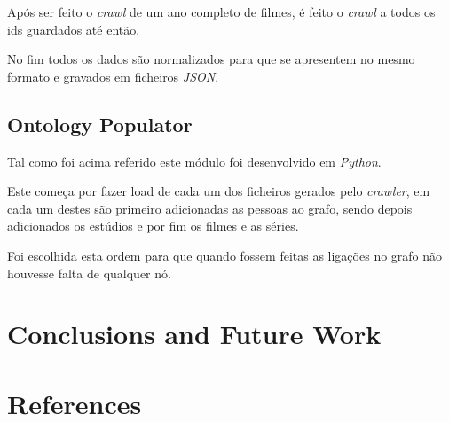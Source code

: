 \documentclass[a4paper]{article}
\begin{document}
Após ser feito o \textit{crawl} de um ano completo de filmes, é feito o \textit{crawl} a todos os ids guardados até então.

No fim todos os dados são normalizados para que se apresentem no mesmo formato e gravados em ficheiros \textit{JSON}.

\subsection{Ontology Populator}
\indent \indent Tal como foi acima referido este módulo foi desenvolvido em \textit{Python}. 

Este começa por fazer load de cada um dos ficheiros gerados pelo \textit{crawler}, em cada um destes são primeiro adicionadas as pessoas ao grafo, sendo depois adicionados os estúdios e por fim os filmes e as séries.

Foi escolhida esta ordem para que quando fossem feitas as ligações no grafo não houvesse falta de qualquer nó.

\section{Conclusions and Future Work}
\indent \indent

\section{References}
\indent \indent
\end{document}
